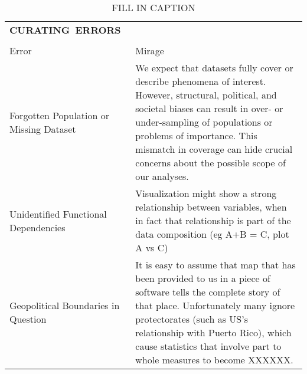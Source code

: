 
  \begin{longtable}{p{3cm}p{14cm}}
    \caption{FILL IN CAPTION}

    
  \\\hbox{\normalsize{\textbf{CURATING ERRORS}}}&\\ \\
  \normalsize{Error} & \normalsize{Mirage}\\ \hline
   \rowcolor{colora}Forgotten Population or Missing Dataset  & We expect that datasets fully cover or describe phenomena of interest. However, structural, political, and societal biases can result in over- or under-sampling of populations or problems of importance. This mismatch in coverage can hide crucial concerns about the possible scope of our analyses. \cite{missingdatasets, dignazio2019draft}\\
 \rowcolor{colora-opaque}Unidentified Functional Dependencies & Visualization might show a strong relationship between variables, when in fact that relationship is part of the data composition (eg A+B = C, plot A vs C) \cite{wang2019uni}\\
 \rowcolor{colora}Geopolitical Boundaries in Question & It is easy to assume that map that has been provided to us in a piece of software tells the complete story of that place. Unfortunately many ignore protectorates (such as US's relationship with Puerto Rico), which cause statistics that involve part to whole measures to become XXXXXX. \cite{missingdatasets}\\
  


\end{longtable}
